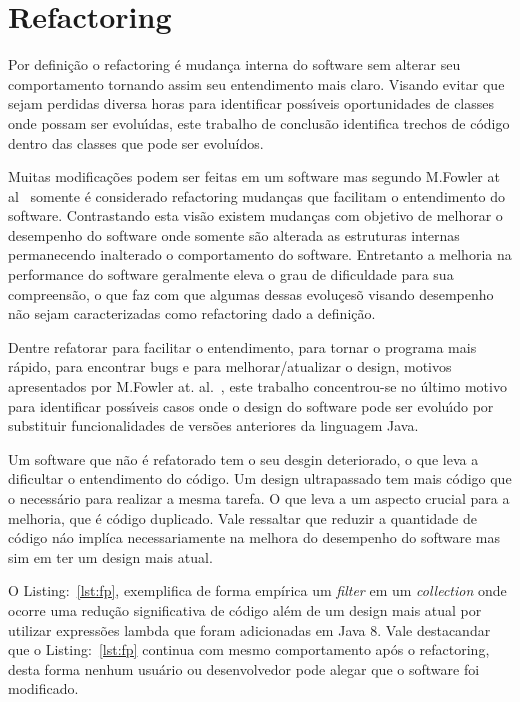 \section{Refactoring}\label{sec:refactoring}

Por defini\c{c}\~{a}o o refactoring \'{e} mudan\c{c}a interna do software sem alterar seu comportamento tornando assim seu entendimento mais claro. Visando evitar que sejam perdidas diversa horas para identificar poss\'{\i}veis oportunidades de classes onde possam ser evolu\'{\i}das, este trabalho de conclus\~{a}o identifica trechos de c\'{o}digo dentro das classes que pode ser evolu\'{i}dos.

Muitas modifica\c{c}\~{o}es podem ser feitas em um software mas segundo M.Fowler at al~\cite{martinFowlerRafactoring} somente \'{e} considerado refactoring mudan\c{c}as que facilitam o entendimento do software. Contrastando esta vis\~{a}o existem mudanças com objetivo de melhorar o desempenho do software onde somente s\~{a}o alterada as estruturas internas permanecendo inalterado o comportamento do software. Entretanto a melhoria na performance do software geralmente eleva o grau de dificuldade para sua compreens\~{a}o, o que faz com que algumas dessas evolu\c{c}es\~{o} visando desempenho n\~{a}o sejam caracterizadas como refactoring dado a defini\c{c}\~{a}o.

Dentre refatorar para facilitar o entendimento, para tornar o programa mais r\'{a}pido, para encontrar bugs e para melhorar/atualizar o design, motivos apresentados por M.Fowler at. al.~\cite{martinFowlerRafactoring}, este trabalho concentrou-se no \'{u}ltimo motivo para identificar poss\'{\i}veis casos onde o design do software pode ser evolu\'{\i}do por substituir funcionalidades de vers\~{o}es anteriores da linguagem Java.

Um software que n\~{a}o \'{e} refatorado tem o seu desgin deteriorado, o que leva a dificultar o entendimento do c\'{o}digo. Um design ultrapassado tem mais c\'{o}digo que o necess\'{a}rio para realizar a mesma tarefa. O que leva a um aspecto crucial para a melhoria, que \'{e} código duplicado. Vale ressaltar que reduzir a quantidade de c\'{o}digo n\'{a}o impl\'{i}ca necessariamente na melhora do desempenho do software mas sim em ter um design mais atual.

O Listing:~\ref{lst:fp}, exemplifica de forma emp\'{i}rica um {\it filter} em um {\it collection} onde ocorre uma redu\c{c}\~{a}o significativa de c\'{o}digo al\'{e}m de um design mais atual por utilizar express\~{o}es lambda que foram adicionadas em Java 8. Vale destacandar que o Listing:~\ref{lst:fp} continua com mesmo comportamento após o refactoring, desta forma nenhum usuário ou desenvolvedor pode alegar que o software foi modificado.


